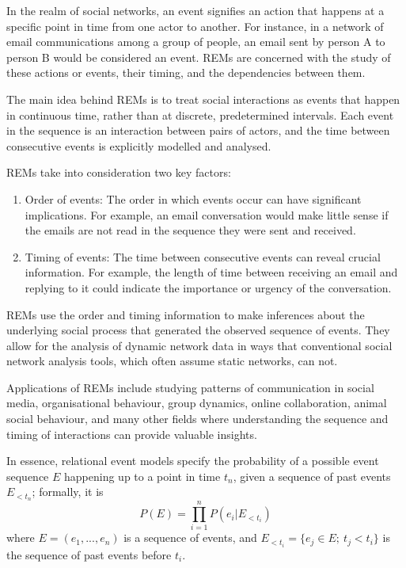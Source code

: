 In the realm of social networks, an event signifies an action that happens at a specific point in time from one actor to another. For instance, in a network of email communications among a group of people, an email sent by person A to person B would be considered an event. REMs are concerned with the study of these actions or events, their timing, and the dependencies between them.

The main idea behind REMs is to treat social interactions as events that happen in continuous time, rather than at discrete, predetermined intervals. Each event in the sequence is an interaction between pairs of actors, and the time between consecutive events is explicitly modelled and analysed. 

\noindent REMs take into consideration two key factors:

\begin{enumerate}
	\item Order of events: The order in which events occur can have significant implications. For example, an email conversation would make little sense if the emails are not read in the sequence they were sent and received.
	\item Timing of events: The time between consecutive events can reveal crucial information. For example, the length of time between receiving an email and replying to it could indicate the importance or urgency of the conversation.
\end{enumerate}

REMs use the order and timing information to make inferences about the underlying social process that generated the observed sequence of events. They allow for the analysis of dynamic network data in ways that conventional social network analysis tools, which often assume static networks, can not. 

Applications of REMs include studying patterns of communication in social media, organisational behaviour, group dynamics, online collaboration, animal social behaviour, and many other fields where understanding the sequence and timing of interactions can provide valuable insights.

In essence, relational event models specify the probability of a possible event sequence $E$ happening up to a point in time $t_n$, given a sequence of past events $E_{<t_n}$; formally, it is
\begin{equation*}
	P(E) = \prod_{i=1}^{n}P(e_i|E_{<t_i})
\end{equation*}
where $E = (e_1,...,e_n)$ is a sequence of events, and $E_{<t_i} = \{e_j \in E;\: t_j < t_i\}$ is the sequence of past events before $t_i$.

